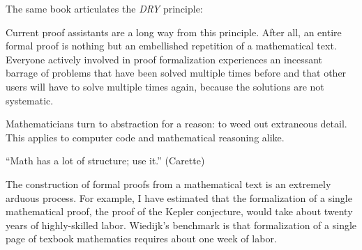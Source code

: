 \documentclass{llncs}
\newcommand{\ring}[1]{\mathbb{#1}}
\begin{document}
  The same book articulates the {\it DRY} principle:

Current proof assistants are a long way from this principle.  After
all, an entire formal proof is nothing but an embellished repetition
of a mathematical text.  Everyone actively involved in proof
formalization experiences an incessant barrage of problems that have
been solved multiple times before and that other users will have to
solve multiple times again, because the solutions are not systematic.




Mathematicians  turn to abstraction for a reason: to weed out
extraneous detail.  This applies to computer code and mathematical
reasoning alike.

``Math has a lot of structure; use it.'' (Carette)


The construction of formal proofs from a mathematical text is an extremely
arduous process.  For example, I have estimated that the formalization of a single
mathematical proof, the proof of the Kepler conjecture, would take about twenty
years of highly-skilled labor.  Wiedijk's benchmark is that formalization
of a single page of texbook mathematics requires about one week of labor.
\end{document}
